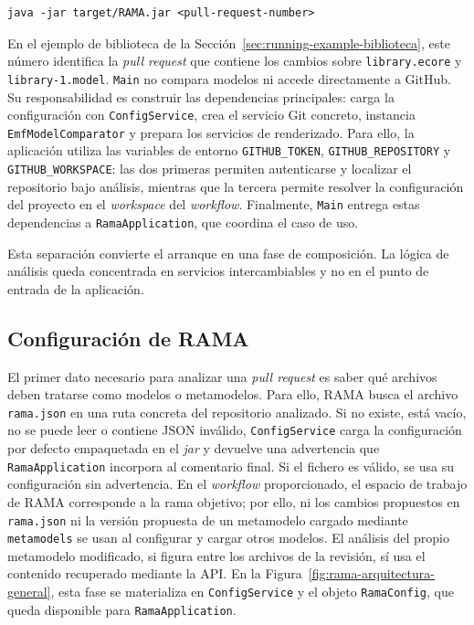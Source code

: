 \documentclass[11pt]{article}
\begin{document}
\begin{verbatim}
java -jar target/RAMA.jar <pull-request-number>
\end{verbatim}

En el ejemplo de biblioteca de la Sección~\ref{sec:running-example-biblioteca}, este número identifica la \textit{pull request} que contiene los cambios sobre \texttt{library.ecore} y \texttt{library-1.model}. \texttt{Main} no compara modelos ni accede directamente a GitHub. Su responsabilidad es construir las dependencias principales: carga la configuración con \texttt{ConfigService}, crea el servicio Git concreto, instancia \texttt{EmfModelComparator} y prepara los servicios de renderizado. Para ello, la aplicación utiliza las variables de entorno \texttt{GITHUB\_TOKEN}, \texttt{GITHUB\_REPOSITORY} y \texttt{GITHUB\_WORKSPACE}: las dos primeras permiten autenticarse y localizar el repositorio bajo análisis, mientras que la tercera permite resolver la configuración del proyecto en el \textit{workspace} del \textit{workflow}. Finalmente, \texttt{Main} entrega estas dependencias a \texttt{RamaApplication}, que coordina el caso de uso.

Esta separación convierte el arranque en una fase de composición. La lógica de análisis queda concentrada en servicios intercambiables y no en el punto de entrada de la aplicación.

\subsection{Configuración de RAMA}

El primer dato necesario para analizar una \textit{pull request} es saber qué archivos deben tratarse como modelos o metamodelos. Para ello, RAMA busca el archivo \texttt{rama.json} en una ruta concreta del repositorio analizado. Si no existe, está vacío, no se puede leer o contiene JSON inválido, \texttt{ConfigService} carga la configuración por defecto empaquetada en el \textit{jar} y devuelve una advertencia que \texttt{RamaApplication} incorpora al comentario final. Si el fichero es válido, se usa su configuración sin advertencia. En el \textit{workflow} proporcionado, el espacio de trabajo de RAMA corresponde a la rama objetivo; por ello, ni los cambios propuestos en \texttt{rama.json} ni la versión propuesta de un metamodelo cargado mediante \texttt{metamodels} se usan al configurar y cargar otros modelos. El análisis del propio metamodelo modificado, si figura entre los archivos de la revisión, sí usa el contenido recuperado mediante la API. En la Figura~\ref{fig:rama-arquitectura-general}, esta fase se materializa en \texttt{ConfigService} y el objeto \texttt{RamaConfig}, que queda disponible para \texttt{RamaApplication}.
\end{document}
